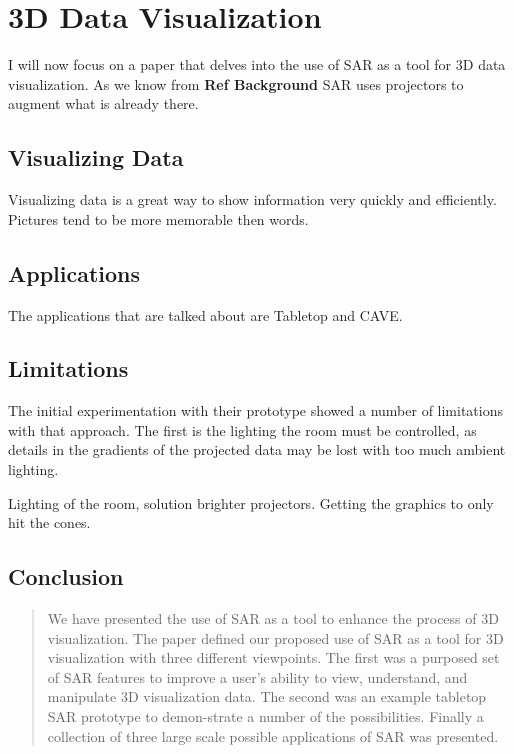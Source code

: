 \documentclass{sig-alternate}
\begin{document}
\section{3D Data Visualization}
\label{sec:3D Data Visualization}

I will now focus on a paper that delves into the use of SAR as a tool for 3D data visualization. As we know from \textbf{Ref Background} SAR uses projectors to augment what is already there. 

\subsection{Visualizing Data}
\label{sec:Visualizing Data}

Visualizing data is a great way to show information very quickly and efficiently. Pictures tend to be more memorable then words.     

\subsection{Applications}
\label{sec:Applications}

The applications that are talked about are Tabletop and CAVE.


\subsection{Limitations}
\label{sec:Limitations}

The initial experimentation with their prototype showed a number of limitations with that approach. The first is the lighting the room must be controlled, as details in the gradients of the projected data may be lost with too much ambient lighting.


Lighting of the room, solution brighter projectors. Getting the graphics to only hit the cones.   

\subsection{Conclusion}
\label{sec:Conclusion}

\begin{quote}
We have presented the use of SAR as a tool to enhance the process of 3D visualization. The paper defined our proposed use of SAR as a tool for 3D visualization with three different viewpoints. The first was a purposed set of SAR features to improve a user's ability to view, understand, and manipulate 3D visualization data. The second was an example tabletop SAR prototype to demon-strate a number of the possibilities. Finally a collection of three large scale possible applications of SAR was presented.
\end{quote}
\end{document}
